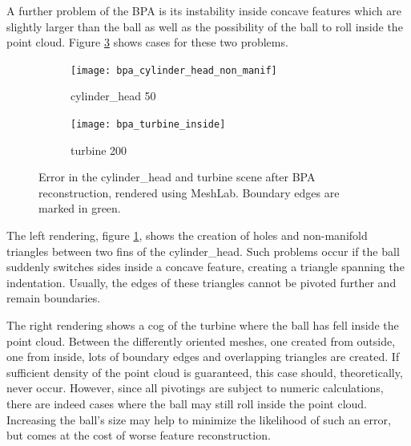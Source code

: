 A further problem of the BPA is its instability inside concave features which are slightly larger than the ball as well as the possibility of the ball to roll inside the point cloud.
Figure \ref{fig:bpa_issues} shows cases for these two problems.%
\begin{figure}
	\centering
	\begin{subfigure}[b]{0.49\textwidth}
		\centering
		\texttt{[image: bpa\_cylinder\_head\_non\_manif]}
		\caption{cylinder\_head 50}
		\label{fig:bpa_cylinder_head_non_manif}
	\end{subfigure}
	\begin{subfigure}[b]{0.49\textwidth}
		\centering
		\texttt{[image: bpa\_turbine\_inside]}
		\caption{turbine 200}
		\label{fig:bpa_turbine_inside}
	\end{subfigure}
	\caption{
		Error in the cylinder\_head and turbine scene after BPA reconstruction, rendered using MeshLab.
		Boundary edges are marked in green.
	}
	\label{fig:bpa_issues}
\end{figure}

The left rendering, figure \ref{fig:bpa_cylinder_head_non_manif}, shows the creation of holes and non-manifold triangles between two fins of the cylinder\_head.
Such problems occur if the ball suddenly switches sides inside a concave feature, creating a triangle spanning the indentation.
Usually, the edges of these triangles cannot be pivoted further and remain boundaries.

The right rendering shows a cog of the turbine where the ball has fell inside the point cloud.
Between the differently oriented meshes, one created from outside, one from inside, lots of boundary edges and overlapping triangles are created.
If sufficient density of the point cloud is guaranteed, this case should, theoretically, never occur.
However, since all pivotings are subject to numeric calculations, there are indeed cases where the ball may still roll inside the point cloud.
Increasing the ball's size may help to minimize the likelihood of such an error, but comes at the cost of worse feature reconstruction.

